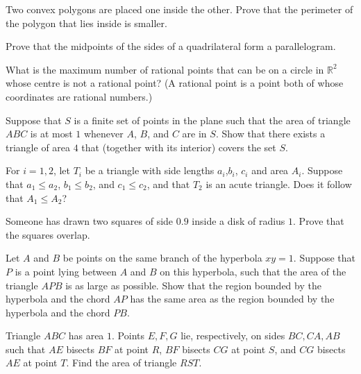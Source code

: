 \documentclass{article}
\begin{document}
\begin{exercise}
Two convex polygons are placed one inside the other. Prove that the perimeter of the polygon that lies inside is smaller.
\end{exercise}

\begin{exercise}
Prove that the midpoints of the sides of a quadrilateral form a parallelogram.
\end{exercise}

\begin{exercise}[2008 B1]
What is the maximum number of rational points that can be on a circle in $\mathbb{R}^{2}$ whose centre is not a rational point? (A rational point is a point both of whose coordinates are rational numbers.)
\end{exercise}

\begin{exercise}[2016 B3] 
Suppose that $S$ is a finite set of points in the plane such that the area of triangle $ABC$ is at most $1$ whenever $A$, $B$, and $C$ are in $S$. Show that there exists a triangle of area $4$ that (together with its interior) covers the set $S$.
\end{exercise}

\begin{exercise}[2004 A2]
For $i = 1, 2$, let $T_{i}$ be a triangle with side lengths $a_i$,$b_i$, $c_i$ and area $A_i$. Suppose that $a_{1} \leq a_{2}$, $b_{1} \leq b_{2}$, and $c_{1} \leq c_{2}$, and that $T_{2}$ is an acute triangle. Does it follow that $A_{1} \leq A_{2}$? 
\end{exercise}

\begin{exercise}
Someone has drawn two squares of side $0.9$ inside a disk of radius $1$. Prove that the squares overlap.
\end{exercise}

\begin{exercise}[2015 A1]
Let $A$ and $B$ be points on the same branch of the hyperbola $xy = 1$. Suppose that $P$ is a point lying between $A$ and $B$ on this hyperbola, such that the area of the triangle $APB$ is as large as possible. Show that the region bounded by the hyperbola and the chord $AP$ has the same area as the region bounded by the hyperbola and the chord $PB$.
\end{exercise}

\begin{exercise}[2001 A4]
Triangle $ABC$ has area $1$. Points $E, F, G$ lie, respectively, on sides $BC, CA, AB$ such that $AE$ bisects $BF$ at point $R$, $BF$ bisects $CG$ at point $S$, and $CG$ bisects $AE$ at point $T$. Find the area of triangle $RST$.
\end{exercise}
\end{document}
